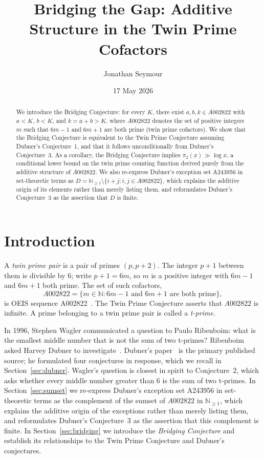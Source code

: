\documentclass[12pt]{amsart}
\title[Bridging the Gap]{Bridging the Gap: Additive Structure in the Twin Prime Cofactors}
\author{Jonathan Seymour}
\date{17 May 2026}
\theoremstyle{definition}
\newcommand{\N}{\mathbb{N}}
\begin{document}
\begin{abstract}
We introduce the Bridging Conjecture: for every $K$, there exist $a, b, k \in A002822$
with $a < K$, $b < K$, and $k = a + b > K$, where $A002822$ denotes the set of positive
integers $m$ such that $6m-1$ and $6m+1$ are both prime (twin prime cofactors). We show
that the Bridging Conjecture is equivalent to the Twin Prime Conjecture assuming
Dubner's Conjecture~1, and that it follows unconditionally from Dubner's Conjecture~3.
As a corollary, the Bridging Conjecture implies $\pi_2(x) \gg \log x$, a conditional
lower bound on the twin prime counting function derived purely from the additive structure
of $A002822$. We also re-express Dubner's exception set A243956 in set-theoretic terms as
$D = \mathbb{N}_{\geq 1} \setminus \{ i + j : i, j \in A002822 \}$, which explains the
additive origin of its elements rather than merely listing them, and reformulates
Dubner's Conjecture~3 as the assertion that $D$ is finite.
\end{abstract}

\maketitle

\section{Introduction}

A \emph{twin prime pair} is a pair of primes $(p, p+2)$. The integer $p+1$ between them
is divisible by 6; write $p+1 = 6m$, so $m$ is a positive integer with $6m-1$ and $6m+1$
both prime. The set of such cofactors,
\[
  A002822 = \{ m \in \N : 6m-1 \text{ and } 6m+1 \text{ are both prime} \},
\]
is OEIS sequence A002822~\cite{oeis-a002822}. The Twin Prime Conjecture asserts that
$A002822$ is infinite. A prime belonging to a twin prime pair is called a \emph{t-prime}.

In 1996, Stephen Wagler communicated a question to Paulo Ribenboim: what is the smallest
middle number that is not the sum of two t-primes? Ribenboim asked Harvey Dubner to
investigate~\cite[pp.~291--299]{ribenboim1996}. Dubner's paper~\cite{dubner1999} is the
primary published source; he formulated four conjectures in response, which we recall in
Section~\ref{sec:dubner}. Wagler's question is closest in spirit to Conjecture~2, which
asks whether every middle number greater than $6$ is the sum of two t-primes. In Section~\ref{sec:sumset} we re-express Dubner's exception set A243956 in set-theoretic
terms as the complement of the sumset of $A002822$ in $\N_{\geq 1}$, which explains the
additive origin of the exceptions rather than merely listing them, and reformulates
Dubner's Conjecture~3 as the assertion that this complement is finite.
In Section~\ref{sec:bridging} we introduce the \emph{Bridging Conjecture} and establish
its relationships to the Twin Prime Conjecture and Dubner's conjectures.
\end{document}
